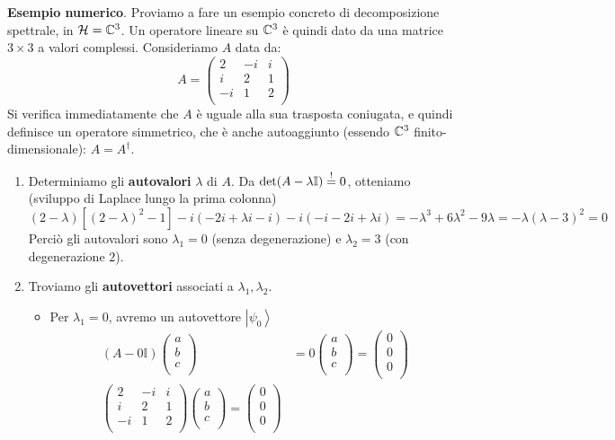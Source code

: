\textbf{Esempio numerico}. 
Proviamo a fare un esempio concreto di decomposizione spettrale, in $\mathcal{H} = \mathbb{C}^3$. Un operatore lineare su $\mathbb{C}^3$ è quindi dato da una matrice $3\times 3$ a valori complessi. Consideriamo $A$ data da:
\[
A=\left(\begin{matrix}2&-i&i\\i&2&1\\-i&1&2\\\end{matrix}\right) 
\]
Si verifica immediatamente che $A$ è uguale alla sua trasposta coniugata, e quindi definisce un operatore simmetrico, che è anche autoaggiunto (essendo $\mathbb{C}^3$ finito-dimensionale): $A = A^\dag$.\\
\begin{enumerate}
    \item Determiniamo gli \textbf{autovalori} $\lambda$ di $A$. Da $\operatorname{det}(A-\lambda \mathbb{I}) \overset{!}{=} 0$, otteniamo (sviluppo di Laplace lungo la prima colonna)
    \[
    (2-\lambda)[(2-\lambda)^2-1]-i(-2i+\lambda i -i)-i(-i -2i +\lambda i) = -\lambda^3 + 6\lambda^2 - 9\lambda = -\lambda(\lambda -3)^2 = 0
    \]
    Perciò gli autovalori sono $\lambda_1 = 0$ (senza degenerazione) e $\lambda_2 = 3$ (con degenerazione $2$).\\
    \item Troviamo gli \textbf{autovettori} associati a $\lambda_1, \lambda_2$.
    \begin{itemize}
    \item Per $\lambda_1 =0$, avremo un autovettore $\left|\psi_0\right\rangle$
	\begin{align*}
	\left(A-0\mathbb{I}\right)\left(\begin{matrix}a\\b\\c\\\end{matrix}\right)&=0\left(\begin{matrix}a\\b\\c\\\end{matrix}\right)=\left(\begin{matrix}0\\0\\0\\\end{matrix}\right)\\
	\left(\begin{matrix}2&-i&i\\i&2&1\\-i&1&2\\\end{matrix}\right)\left(\begin{matrix}a\\b\\c\\\end{matrix}\right)=\left(\begin{matrix}0\\0\\0\\\end{matrix}\right)

\end{align*}
\end{itemize}
\end{enumerate}
